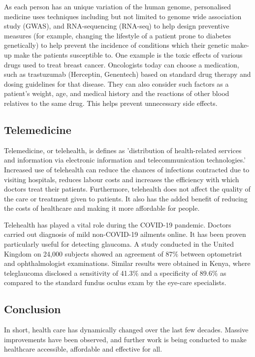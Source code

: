 \documentclass[11pt]{article}
\begin{document}
As each person has an unique variation of the human genome, personalised medicine uses techniques including but not limited to genome wide association study (GWAS), and RNA-sequencing (RNA-seq) to help design preventive measures (for example, changing the lifestyle of a patient prone to diabetes genetically) to help prevent the incidence of conditions which their genetic make-up make the patients susceptible to. One example is the toxic effects of various drugs used to treat breast cancer. Oncologists today can choose a medication, such as trastuzumab (Herceptin, Genentech) based on standard drug therapy and dosing guidelines for that disease. They can also consider such factors as a patient’s weight, age, and medical history and the reactions of other blood relatives to the same drug. This helps prevent unnecessary side effects.

\subsection*{Telemedicine}

Telemedicine, or telehealth, is defines as 'distribution of health-related services and information via electronic information and telecommunication technologies.' Increased use of telehealth can reduce the chances of infections contracted due to visiting hospitals, reduces labour costs and increases the efficiency with which doctors treat their patients. Furthermore, telehealth does not affect the quality of the care or treatment given to patients. It also has the added benefit of reducing the costs of healthcare and making it more affordable for people.

Telehealth has played a vital role during the COVID-19 pandemic. Doctors carried out diagnosis of mild non-COVID-19 ailments online. It has been proven particularly useful for detecting glaucoma. A study conducted in the United Kingdom on 24,000 subjects showed an agreement of 87$\%$ between optometrist and ophthalmologist examinations. Similar results were obtained in Kenya, where teleglaucoma disclosed a sensitivity of 41.3$\%$ and a specificity of 89.6$\%$ as compared to the standard fundus oculus exam by the eye-care specialists.

\subsection*{Conclusion}

In short, health care has dynamically changed over the last few decades. Massive improvements have been observed, and further work is being conducted to make healthcare accessible, affordable and effective for all.
\end{document}
